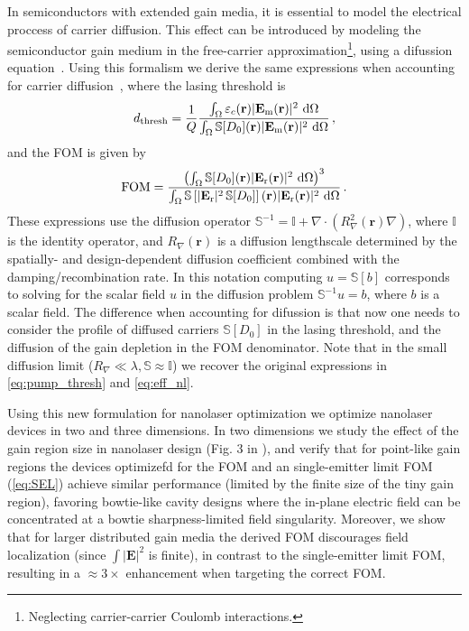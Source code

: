 In semiconductors with extended gain media, it is essential to model the electrical proccess of carrier diffusion. This effect can be introduced by modeling the semiconductor gain medium in the free-carrier approximation\footnote{Neglecting carrier-carrier Coulomb interactions.}, using a difussion 
equation~\cite{csalt}. Using this formalism we derive the same expressions when accounting for carrier diffusion~\cite{ownpub4}, where the lasing threshold is
\begin{equation}\label{eq:pump_thresh_diff}
    d_\text{thresh} = \frac{1}{Q} \frac{\int_{\Omega} \varepsilon_c(\mathbf{r})|\mathbf{E}_{\text{m}}(\mathbf{r})|^2\,  \mathop{}\!\text{d} \Omega}{\int_{\Omega} \mathbb{S} [D_0] (\mathbf{r}) |\mathbf{E}_{\text{m}}(\mathbf{r})|^2\,  \mathop{}\!\text{d} \Omega}\,,
\end{equation}
and the FOM is given by
\begin{equation}\label{eq:eff_diff}
    \text{FOM} =  \frac{\left(\int_{\Omega} \mathbb{S} [D_0](\mathbf{r}) |\mathbf{E}_{\text{r}}(\mathbf{r})|^2 \,  \mathop{}\!\text{d} \Omega\right)^3} {\int_{\Omega} \mathbb{S}\left[ |\mathbf{E}_{\text{r}}|^2\, \mathbb{S} [D_0] \right] (\mathbf{r})|\mathbf{E}_{\text{r}}(\mathbf{r})|^2 \,  \mathop{}\!\text{d} \Omega}\,.
\end{equation}
These expressions use the diffusion operator $\mathbb{S}^{-1}= \mathbb{I}+\nabla \cdot (R_\nabla^2(\mathbf{r}) \nabla)$, where $\mathbb{I}$ is the identity operator, and $R_\nabla (\mathbf{r})$ is a diffusion lengthscale determined by the spatially- and design-dependent diffusion coefficient combined with the damping/recombination rate. 
In this notation computing $u = \mathbb{S}[b]$ corresponds to solving for the scalar field $u$ in the diffusion problem $\mathbb{S}^{-1}u=b$, where $b$ is a scalar field. 
The difference when accounting for difussion is that now one needs to consider the profile of diffused carriers $\mathbb{S} [D_0]$ in the lasing threshold, and the diffusion of the gain depletion
in the FOM denominator. Note that in the small diffusion limit ($R_\nabla \ll \lambda, \mathbb{S} \approx \mathbb{I}$)
we recover the original expressions in \eqref{eq:pump_thresh} and \eqref{eq:eff_nl}.

Using this new formulation for nanolaser optimization we optimize nanolaser devices in two and three dimensions. In two dimensions we study the effect of the gain region size in 
nanolaser design (Fig. 3 in \cite{ownpub4}), and verify that for point-like gain regions the devices optimizefd for the FOM and an single-emitter limit FOM (\eqref{eq:SEL})
achieve similar performance (limited by the finite size of the tiny gain region), favoring bowtie-like cavity designs
where the in-plane electric field can be concentrated at a bowtie sharpness-limited field singularity. Moreover, we show that for
larger distributed gain media the derived FOM discourages field localization (since $\int \vert \mathbf{E} \vert^2$ is finite), in contrast to the single-emitter limit FOM, 
resulting in a $\approx 3\times$ enhancement when targeting the correct FOM. 

